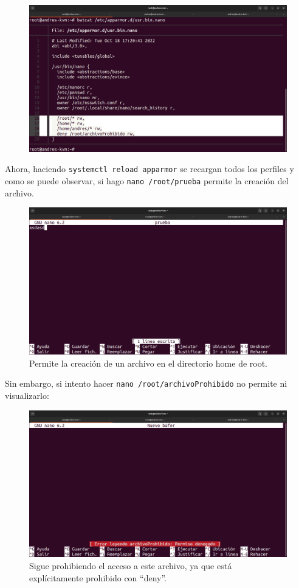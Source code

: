 \documentclass{article}
\begin{document}
\begin{figure}[H]
    \centering
    \includegraphics[width=\textwidth]{imagenes/Captura desde 2022-10-18 17-30-04.png}
\end{figure}

Ahora, haciendo \verb|systemctl reload apparmor| se recargan todos los perfiles y como se puede observar, si hago \verb|nano /root/prueba| permite la creación del archivo.

\begin{figure}[H]
    \centering
    \includegraphics[width=\textwidth]{imagenes/Captura desde 2022-10-18 17-26-43.png}
    \caption{Permite la creación de un archivo en el directorio home de root.}
\end{figure}

\bigskip

Sin embargo, si intento hacer \verb|nano /root/archivoProhibido| no permite ni visualizarlo:

\begin{figure}[H]
    \centering
    \includegraphics[width=\textwidth]{imagenes/Captura desde 2022-10-18 17-26-52.png}
    \caption{Sigue prohibiendo el acceso a este archivo, ya que está explícitamente prohibido con ``deny''.}
\end{figure}
\end{document}
